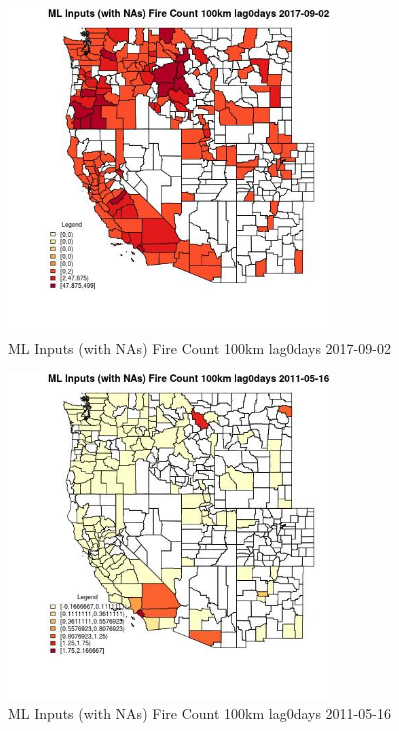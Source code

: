 \begin{figure} 
\centering  
\includegraphics[width=0.77\textwidth]{Code_Outputs/Report_ML_input_PM25_Step4_part_e_de_duplicated_aves_compiled_2019-05-20wNAs_CountyFire_Count_100km_lag0daysMean2017-09-02.jpg} 
\caption{\label{fig:Report_ML_input_PM25_Step4_part_e_de_duplicated_aves_compiled_2019-05-20wNAsCountyFire_Count_100km_lag0daysMean2017-09-02}ML Inputs (with NAs) Fire Count 100km lag0days 2017-09-02} 
\end{figure} 
 

\begin{figure} 
\centering  
\includegraphics[width=0.77\textwidth]{Code_Outputs/Report_ML_input_PM25_Step4_part_e_de_duplicated_aves_compiled_2019-05-20wNAs_CountyFire_Count_100km_lag0daysMean2011-05-16.jpg} 
\caption{\label{fig:Report_ML_input_PM25_Step4_part_e_de_duplicated_aves_compiled_2019-05-20wNAsCountyFire_Count_100km_lag0daysMean2011-05-16}ML Inputs (with NAs) Fire Count 100km lag0days 2011-05-16} 
\end{figure} 
 

